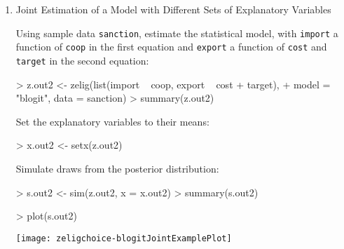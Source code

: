 \documentclass{article}
\begin{document}
\begin{enumerate}
\item {Joint Estimation of a Model with Different Sets of Explanatory Variables}\label{sto.dep.logit}

Using sample data \texttt{sanction}, estimate the statistical model, 
with {\tt import} a function of {\tt coop} in the first equation and {\tt export} a 
function of {\tt cost} and {\tt target} in the second equation:
\begin{Schunk}
\begin{Sinput}
>  z.out2 <- zelig(list(import ~ coop, export ~ cost + target), 
+                   model = "blogit", data = sanction)
>  summary(z.out2)
\end{Sinput}
\end{Schunk}
Set the explanatory variables to their means:
\begin{Schunk}
\begin{Sinput}
>  x.out2 <- setx(z.out2)
\end{Sinput}
\end{Schunk}
Simulate draws from the posterior distribution:
\begin{Schunk}
\begin{Sinput}
>  s.out2 <- sim(z.out2, x = x.out2)
>  summary(s.out2)
\end{Sinput}
\end{Schunk}
\begin{center}
\begin{Schunk}
\begin{Sinput}
>  plot(s.out2)
\end{Sinput}
\end{Schunk}
\texttt{[image: zeligchoice-blogitJointExamplePlot]}
\end{center}

%   


\end{enumerate}
\end{document}

